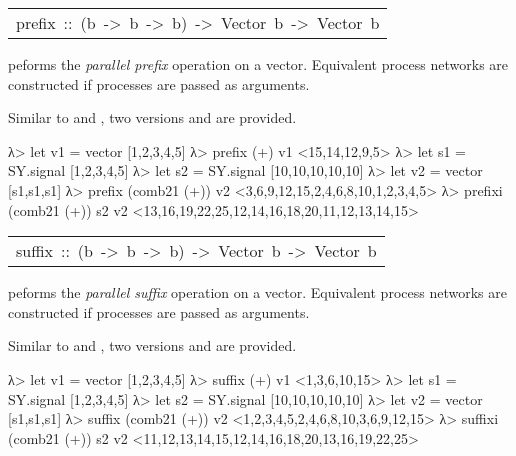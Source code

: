 \begin{haddockdesc}
\begin{interactive}
\end{interactive}\par
           

\item[\begin{tabular}{@{}l}
prefix\ ::\ (b\ ->\ b\ ->\ b)\ ->\ Vector\ b\ ->\ Vector\ b
\end{tabular}]\haddockbegindoc
{} peforms the \emph{parallel prefix} operation on a vector.
 Equivalent process networks are constructed if processes are passed
 as arguments.\par
Similar to  and , two versions  and
  are provided.\par
\begin{interactive}
λ> let v1 = vector [1,2,3,4,5]
λ> prefix (+) v1
<15,14,12,9,5>
λ> let s1 = SY.signal [1,2,3,4,5]
λ> let s2 = SY.signal [10,10,10,10,10]
λ> let v2 = vector [s1,s1,s1]
λ> prefix (comb21 (+)) v2
<{3,6,9,12,15},{2,4,6,8,10},{1,2,3,4,5}>
λ> prefixi (comb21 (+)) s2 v2
<{13,16,19,22,25},{12,14,16,18,20},{11,12,13,14,15}>

\end{interactive}\par
           \par
           \par
           

\item[\begin{tabular}{@{}l}
suffix\ ::\ (b\ ->\ b\ ->\ b)\ ->\ Vector\ b\ ->\ Vector\ b
\end{tabular}]\haddockbegindoc
{} peforms the \emph{parallel suffix} operation on a vector.
 Equivalent process networks are constructed if processes are passed
 as arguments.\par
Similar to  and , two versions  and
  are provided.\par
\begin{interactive}
λ> let v1 = vector [1,2,3,4,5]
λ> suffix (+) v1
<1,3,6,10,15>
λ> let s1 = SY.signal [1,2,3,4,5]
λ> let s2 = SY.signal [10,10,10,10,10]
λ> let v2 = vector [s1,s1,s1]
λ> suffix (comb21 (+)) v2
<{1,2,3,4,5},{2,4,6,8,10},{3,6,9,12,15}>
λ> suffixi (comb21 (+)) s2 v2
<{11,12,13,14,15},{12,14,16,18,20},{13,16,19,22,25}>


\end{interactive}
\end{haddockdesc}
